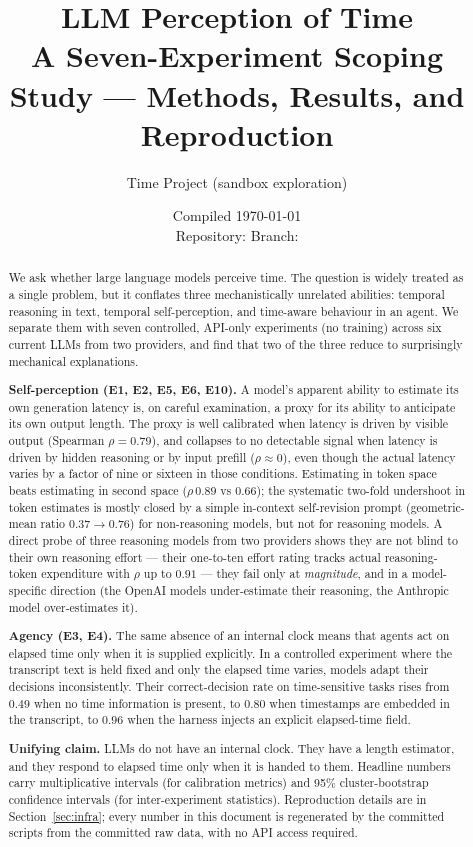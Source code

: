 \documentclass[11pt]{article}
\title{\textbf{LLM Perception of Time}\\[2pt]
\large A Seven-Experiment Scoping Study --- Methods, Results, and Reproduction}
\author{Time Project (sandbox exploration)}
\date{Compiled \today\\[4pt]
\small Repository: \code{explorations/time/} \quad Branch: \code{main}}
\begin{document}
\maketitle

\begin{abstract}
\noindent
We ask whether large language models perceive time. The question is widely treated as a single
problem, but it conflates three mechanistically unrelated abilities: temporal reasoning in
text, temporal self-perception, and time-aware behaviour in an agent. We separate them with
seven controlled, API-only experiments (no training) across six current LLMs from two
providers, and find that two of the three reduce to surprisingly mechanical explanations.

\noindent\textbf{Self-perception (E1, E2, E5, E6, E10).} A model's apparent ability to estimate its own
generation latency is, on careful examination, a proxy for its ability to anticipate its own
output length. The proxy is well calibrated when latency is driven by visible output
(Spearman $\rho = 0.79$), and collapses to no detectable signal when latency is driven by
hidden reasoning or by input prefill ($\rho \approx 0$), even though the actual latency varies
by a factor of nine or sixteen in those conditions. Estimating in token space beats estimating
in second space ($\rho\,0.89$ vs $0.66$); the systematic two-fold undershoot in token estimates
is mostly closed by a simple in-context self-revision prompt (geometric-mean ratio $0.37 \to
0.76$) for non-reasoning models, but not for reasoning models. A direct probe of three reasoning
models from two providers shows they are not blind to their own reasoning effort --- their
one-to-ten effort rating tracks actual reasoning-token expenditure with $\rho$ up to $0.91$ ---
they fail only at \emph{magnitude}, and in a model-specific direction (the OpenAI models
under-estimate their reasoning, the Anthropic model over-estimates it).

\noindent\textbf{Agency (E3, E4).} The same absence of an internal clock means that agents act on
elapsed time only when it is supplied explicitly. In a controlled experiment where the
transcript text is held fixed and only the elapsed time varies, models adapt their decisions
inconsistently. Their correct-decision rate on time-sensitive tasks rises from $0.49$ when no
time information is present, to $0.80$ when timestamps are embedded in the transcript, to
$0.96$ when the harness injects an explicit elapsed-time field.

\noindent\textbf{Unifying claim.} LLMs do not have an internal clock. They have a length estimator,
and they respond to elapsed time only when it is handed to them. Headline numbers carry
multiplicative intervals (for calibration metrics) and 95\% cluster-bootstrap confidence
intervals (for inter-experiment statistics). Reproduction details are in Section~\ref{sec:infra};
every number in this document is regenerated by the committed scripts from the committed raw
data, with no API access required.
\end{abstract}
\end{document}
